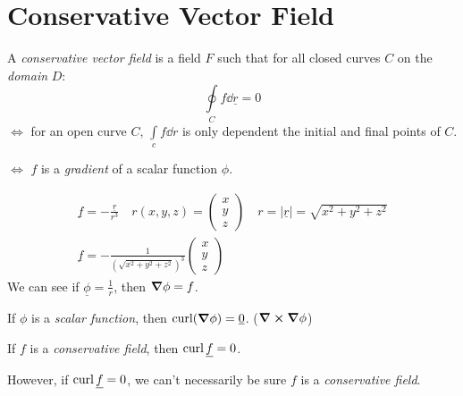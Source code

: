 \documentclass[00_complete]{subfiles}
\begin{document}
\section{Conservative Vector Field}
\begin{definition}
    A \emph{conservative vector field} is a field $F$ such that for all closed
    curves $C$ on the \emph{domain} $D$:
    $$\oint\limits_C f\dd{\underline r}=0$$
    $\iff$ for an open curve $C$, $\int\limits_cf\dd{r}$ is only dependent
    the initial and final points of $C$.

    $\iff$ $f$ is a \emph{gradient} of a scalar function $\phi$.
\end{definition}
\begin{example}
    \begin{gather*}
    \underline f = -\frac{\underline r}{r^3} \quad r(x,y,z)=\begin{pmatrix}
        x\\y\\z
    \end{pmatrix} \quad r = |\underline r| = \sqrt{x^2+y^2+z^2} \\
    \underline f = -\frac{1}{\left(\sqrt{x^2+y^2+z^2}\right)^3}\begin{pmatrix}
        x\\y\\z
    \end{pmatrix}
    \end{gather*}
    We can see if $\underline \phi = \frac{1}{r}$, then $\grad \phi = f$.
\end{example}
\begin{reminder}
    If $\phi$ is a \emph{scalar function}, then $\operatorname{curl}(\grad\phi)=\underline
    0$. ($\curl \grad \phi$)
\end{reminder}
\begin{conclusion}
    If $f$ is a \emph{conservative field}, then $\operatorname{curl} \underline f = 0$.

    However, if $\operatorname{curl} \underline f = 0$, we can't necessarily be sure $f$ is a
    \emph{conservative field}.
\end{conclusion}
\end{document}
